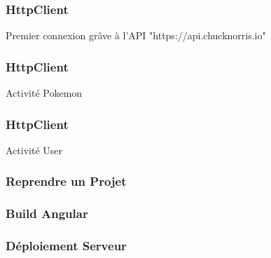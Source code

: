 \documentclass[10pt]{beamer}
\begin{document}
    \begin{frame}
        \frametitle{HttpClient}

        Premier connexion grâve à l'API "https://api.chucknorris.io"

    \end{frame}

    \begin{frame}
        \frametitle{HttpClient}

        Activité Pokemon

    \end{frame}

    \begin{frame}
        \frametitle{HttpClient}

        Activité User

    \end{frame}


    \begin{frame}
        \frametitle{Reprendre un Projet}


    \end{frame}




    \begin{frame}
        \frametitle{Build Angular}


    \end{frame}



    \begin{frame}
        \frametitle{Déploiement Serveur}


    \end{frame}
\end{document}
